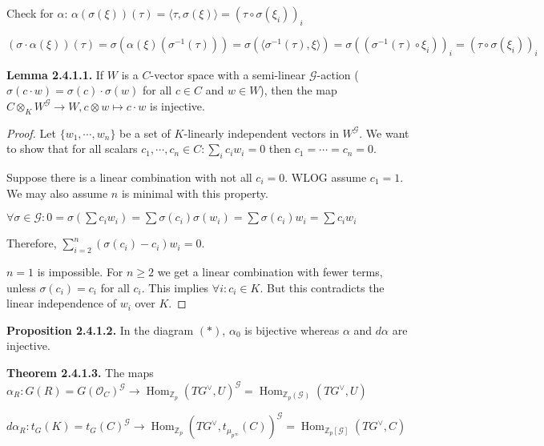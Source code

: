 \documentclass{article}
\theoremstyle{definition}
\numberwithin{theorem}{subsection}
\begin{document}
    Check for \(\alpha\): \(\alpha(\sigma(\xi))(\tau) = \langle \tau , \sigma(\xi) \rangle = (\tau \circ \sigma(\xi_i))_i\)
    
    \((\sigma \cdot \alpha (\xi))(\tau) = \sigma(\alpha(\xi)(\sigma ^{-1} (\tau))) = \sigma (\langle \sigma ^{-1} (\tau), \xi \rangle) = \sigma ((\sigma ^{-1} (\tau) \circ \xi_i))_i = (\tau \circ \sigma(\xi_i))_i\)
    
    \textbf{Lemma 2.4.1.1.} If \(W\) is a \(C\)-vector space with a semi-linear \(\mathscr{G}\)-action (\(\sigma(c \cdot w) = \sigma(c) \cdot \sigma(w)\) for all \(c\in C\) and \(w\in W\)), then the map \(C \otimes_K W^{\mathscr{G}} \to W, c \otimes w \mapsto c \cdot w\) is injective.
    
    \begin{proof}
        Let \(\{ w_1, \cdots , w_n \}\) be a set of \(K\)-linearly independent vectors in \(W^{\mathscr{G}}\). We want to show that for all scalars \(c_1, \cdots , c_n \in C: \sum_{i} c_i w_i = 0\) then \(c_1 = \cdots = c_n = 0\).

        Suppose there is a linear combination with not all \(c_i = 0\). WLOG assume \(c_1 = 1\). We may also assume \(n\) is minimal with this property.

        \(\forall \sigma \in \mathscr{G}: 0 = \sigma \left( \sum c_i w_i \right) = \sum \sigma(c_i) \sigma(w_i) = \sum \sigma(c_i) w_i = \sum c_i w_i\) 

        Therefore, \(\sum_{i=2}^n (\sigma(c_i) - c_i) w_i = 0\).

        \(n = 1\) is impossible. For \(n \geq 2\) we get a linear combination with fewer terms, unless \(\sigma(c_i) = c_i\) for all \(c_i\). This implies \(\forall i: c_i \in K\). But this contradicts the linear independence of \(w_i\) over \(K\).
    \end{proof}
    
    \textbf{Proposition 2.4.1.2.} In the diagram \((\ast)\), \(\alpha_0\) is bijective whereas \(\alpha\) and \(d \alpha\) are injective.

    \textbf{Theorem 2.4.1.3.} The maps \(\alpha_R: G(R) = G(\mathcal{O}_C)^{\mathscr{G}} \to \operatorname{Hom}_{\mathbb{Z}_p}(TG^\vee, U)^{\mathscr{G}} = \operatorname{Hom}_{\mathbb{Z}_p(\mathscr{G})}(TG^\vee, U)\)
    
    \(d \alpha_R : t_G(K) = t_G(C)^{\mathscr{G}} \to \operatorname{Hom}_{\mathbb{Z}_p}(TG^\vee, t_{\mu_{p^{\infty}}}(C))^{\mathscr{G}} = \operatorname{Hom}_{\mathbb{Z}_p[\mathscr{G}]} (TG^\vee, C)\) 
\end{document}
